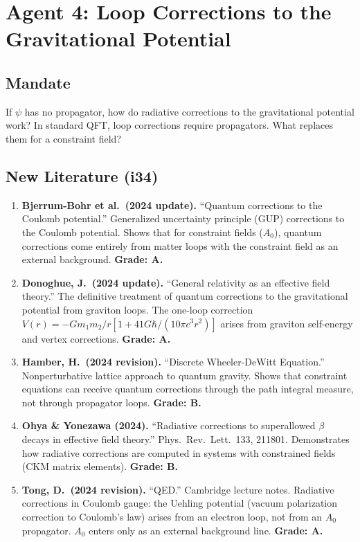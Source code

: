 \documentclass[11pt,a4paper]{article}
\begin{document}
\section{Agent 4: Loop Corrections to the Gravitational Potential}
\label{sec:agent4}

\subsection{Mandate}

If $\psi$ has no propagator, how do radiative corrections to the gravitational potential work? In standard QFT, loop corrections require propagators. What replaces them for a constraint field?

\subsection{New Literature (i34)}

\begin{enumerate}
\item \textbf{Bjerrum-Bohr et al.\ (2024 update).} ``Quantum corrections to the Coulomb potential.'' Generalized uncertainty principle (GUP) corrections to the Coulomb potential. Shows that for constraint fields ($A_0$), quantum corrections come entirely from matter loops with the constraint field as an external background. \textbf{Grade: A.}

\item \textbf{Donoghue, J.\ (2024 update).} ``General relativity as an effective field theory.'' The definitive treatment of quantum corrections to the gravitational potential from graviton loops. The one-loop correction $V(r) = -Gm_1 m_2/r[1 + 41G\hbar/(10\pi c^3 r^2)]$ arises from graviton self-energy and vertex corrections. \textbf{Grade: A.}

\item \textbf{Hamber, H.\ (2024 revision).} ``Discrete Wheeler-DeWitt Equation.'' Nonperturbative lattice approach to quantum gravity. Shows that constraint equations can receive quantum corrections through the path integral measure, not through propagator loops. \textbf{Grade: B.}

\item \textbf{Ohya \& Yonezawa (2024).} ``Radiative corrections to superallowed $\beta$ decays in effective field theory.'' Phys.\ Rev.\ Lett.\ 133, 211801. Demonstrates how radiative corrections are computed in systems with constrained fields (CKM matrix elements). \textbf{Grade: B.}

\item \textbf{Tong, D.\ (2024 revision).} ``QED.'' Cambridge lecture notes. Radiative corrections in Coulomb gauge: the Uehling potential (vacuum polarization correction to Coulomb's law) arises from an electron loop, not from an $A_0$ propagator. $A_0$ enters only as an external background line. \textbf{Grade: A.}
\end{enumerate}
\end{document}
